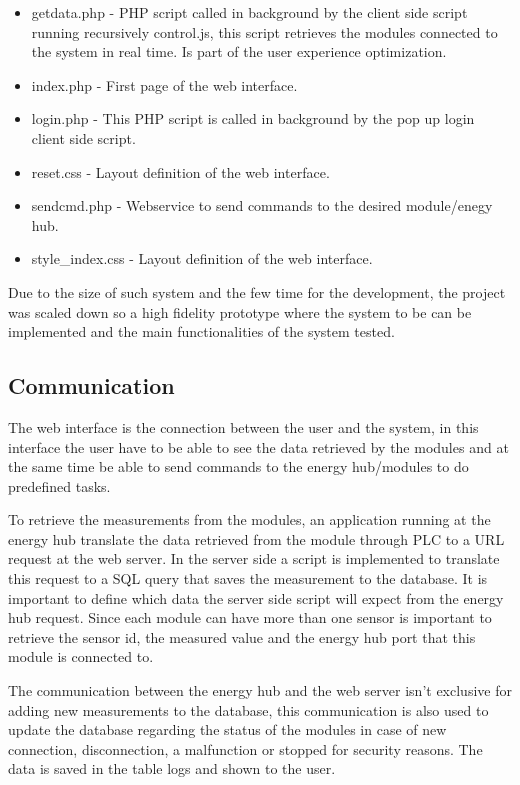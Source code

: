 \begin{itemize}
	\item getdata.php - PHP script called in background by the client side script running recursively control.js, this script retrieves the modules connected to the system in real time. Is part of the user experience optimization.
	\item index.php - First page of the web interface.
	\item login.php  - This PHP script is called in background by the pop up login client side script.
	\item reset.css - Layout definition of the web interface.
	\item sendcmd.php - Webservice to send commands to the desired module/enegy hub.
	\item style\_index.css - Layout definition of the web interface.
\end{itemize}

Due to the size of such system and the few time for the development, the project was scaled down so a high fidelity prototype where the system to be can be implemented and the main functionalities of the system tested.

\subsection{Communication}
The web interface is the connection between the user and the system, in this interface the user have to be able to see the data retrieved by the modules and at the same time be able to send commands to the energy hub/modules to do predefined tasks.

To retrieve the measurements from the modules, an application running at the energy hub translate the data retrieved from the module through PLC to a URL request at the web server. In the server side a script is implemented to translate this request to a SQL query that saves the measurement to the database. It is important to define which data the server side script will expect from the energy hub request. Since each module can have more than one sensor is important to retrieve the sensor id, the measured value and the energy hub port that this module is connected to.

The communication between the energy hub and the web server isn't exclusive for adding new measurements to the database, this communication is also used to update the database regarding the status of the modules in case of new connection, disconnection, a malfunction or stopped for security reasons. The data is saved in the table logs and shown to the user.

